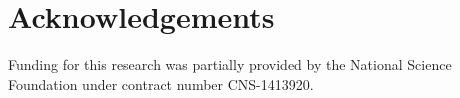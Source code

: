 \section{Acknowledgements}

Funding for this research was partially provided by the National Science Foundation under contract number \mbox{CNS-1413920}.
